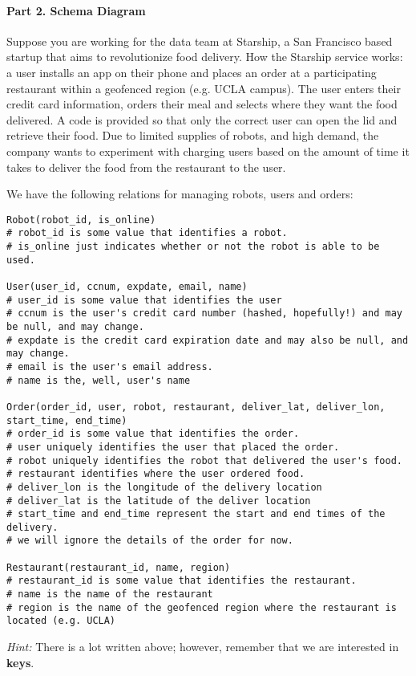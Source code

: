 \documentclass{report}
\renewcommand{\it}[1]{\textit{{#1}}}
\renewcommand{\bf}[1]{\textbf{{#1}}}
\begin{document}
\newpage
\paragraph{Part 2. Schema Diagram}
Suppose you are working for the data team at Starship, a San Francisco based startup that aims to 
revolutionize food delivery. How the Starship service works: a user installs an app on their phone 
and places an order at a participating restaurant within a geofenced region (e.g. UCLA campus). The 
user enters their credit card information, orders their meal and selects where they want the food 
delivered. A code is provided so that only the correct user can open the lid and retrieve their 
food. Due to limited supplies of robots, and high demand, the company wants to experiment with 
charging users based on the amount of time it takes to deliver the food from the restaurant to the 
user. \vspace{10pt}

\noindent We have the following relations for managing robots, users and orders:
\small{
\begin{verbatim}
Robot(robot_id, is_online)
# robot_id is some value that identifies a robot.
# is_online just indicates whether or not the robot is able to be used.

User(user_id, ccnum, expdate, email, name)
# user_id is some value that identifies the user
# ccnum is the user's credit card number (hashed, hopefully!) and may be null, and may change.
# expdate is the credit card expiration date and may also be null, and may change.
# email is the user's email address.
# name is the, well, user's name

Order(order_id, user, robot, restaurant, deliver_lat, deliver_lon, start_time, end_time)
# order_id is some value that identifies the order.
# user uniquely identifies the user that placed the order.
# robot uniquely identifies the robot that delivered the user's food.
# restaurant identifies where the user ordered food.
# deliver_lon is the longitude of the delivery location
# deliver_lat is the latitude of the deliver location
# start_time and end_time represent the start and end times of the delivery.
# we will ignore the details of the order for now.

Restaurant(restaurant_id, name, region)
# restaurant_id is some value that identifies the restaurant.
# name is the name of the restaurant
# region is the name of the geofenced region where the restaurant is located (e.g. UCLA)
\end{verbatim}
}
\noindent \it{Hint:} There is a lot written above; however, remember that we are interested in 
\bf{keys}. \vspace{10pt}
\end{document}
